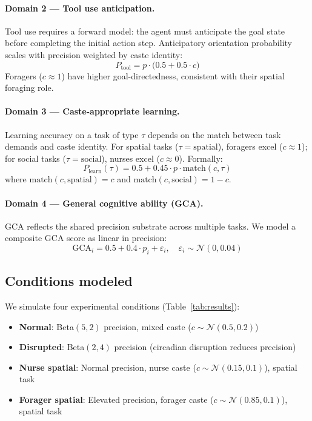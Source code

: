\documentclass[12pt]{article}
\newcommand{\precision}{p}
\begin{document}
\paragraph{Domain 2 --- Tool use anticipation.}
Tool use requires a forward model: the agent must anticipate the goal state before completing the
initial action step. Anticipatory orientation probability scales with precision weighted by caste
identity:
\begin{equation}
  P_{\text{tool}} = \precision \cdot \bigl(0.5 + 0.5 \cdot c\bigr)
\end{equation}
Foragers ($c \approx 1$) have higher goal-directedness, consistent with their spatial foraging role.

\paragraph{Domain 3 --- Caste-appropriate learning.}
Learning accuracy on a task of type $\tau$ depends on the match between task demands and caste
identity. For spatial tasks ($\tau = \text{spatial}$), foragers excel ($c \approx 1$); for social
tasks ($\tau = \text{social}$), nurses excel ($c \approx 0$). Formally:
\begin{equation}
  P_{\text{learn}}(\tau) = 0.5 + 0.45 \cdot \precision \cdot \text{match}(c, \tau)
\end{equation}
where $\text{match}(c, \text{spatial}) = c$ and $\text{match}(c, \text{social}) = 1 - c$.

\paragraph{Domain 4 --- General cognitive ability (GCA).}
GCA reflects the shared precision substrate across multiple tasks. We model a composite GCA score
as linear in precision:
\begin{equation}
  \text{GCA}_i = 0.5 + 0.4 \cdot \precision_i + \varepsilon_i, \quad \varepsilon_i \sim \mathcal{N}(0, 0.04)
\end{equation}

\subsection*{Conditions modeled}

We simulate four experimental conditions (Table~\ref{tab:results}):
\begin{itemize}
  \item \textbf{Normal}: Beta$(5,2)$ precision, mixed caste ($c \sim \mathcal{N}(0.5, 0.2)$)
  \item \textbf{Disrupted}: Beta$(2,4)$ precision (circadian disruption reduces precision)~\cite{SciReports2020}
  \item \textbf{Nurse spatial}: Normal precision, nurse caste ($c \sim \mathcal{N}(0.15, 0.1)$), spatial task
  \item \textbf{Forager spatial}: Elevated precision, forager caste ($c \sim \mathcal{N}(0.85, 0.1)$), spatial task
\end{itemize}
\end{document}
